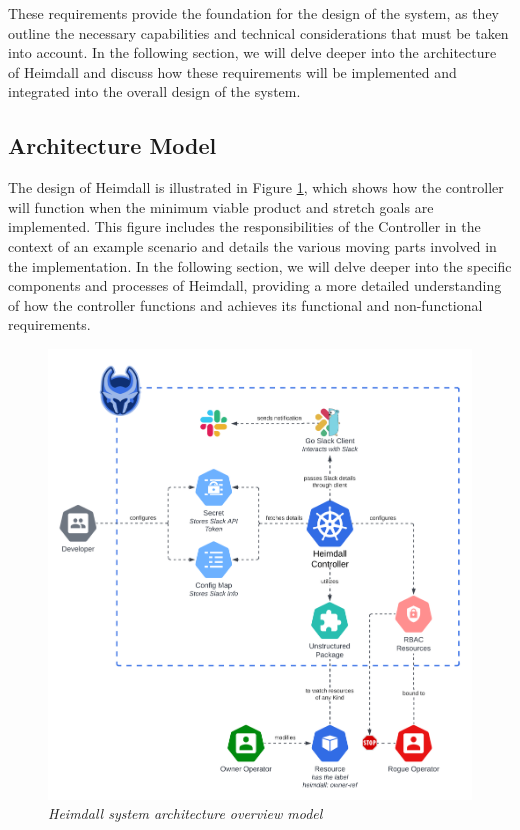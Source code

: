 \documentclass{article}
\begin{document}
These requirements provide the foundation for the design of the system, as they outline the necessary capabilities and technical considerations that must be taken into account. In the following section, we will delve deeper into the architecture of Heimdall and discuss how these requirements will be implemented and integrated into the overall design of the system.

\subsection{Architecture Model}

The design of Heimdall is illustrated in Figure \ref{arch-diag}, which shows how the controller will function when the minimum viable product and stretch goals are implemented. This figure includes the responsibilities of the Controller in the context of an example scenario and details the various moving parts involved in the implementation. In the following section, we will delve deeper into the specific components and processes of Heimdall, providing a more detailed understanding of how the controller functions and achieves its functional and non-functional requirements.

\begin{figure}[H]
    \centering
    \includegraphics[width=160mm]{design/arch-diag.png}
    \caption{\emph{Heimdall system architecture overview model}}
    \label{arch-diag}
\end{figure}
\end{document}
